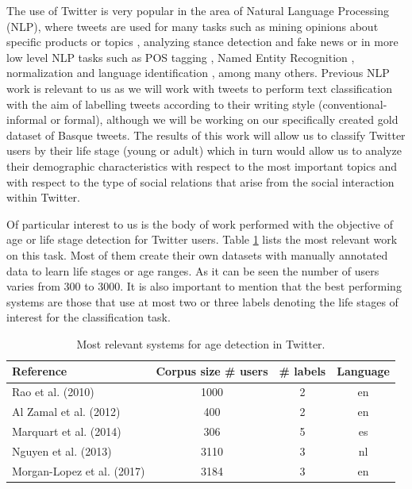 \documentclass[information,article,submit,moreauthors,pdftex,10pt,a4paper]{Definitions/mdpi}
\begin{document}
The use of Twitter is very popular in the area of Natural Language Processing (NLP), where tweets are used for many tasks such as mining opinions about specific products or topics \cite{rosenthal2017semeval,villena2013tass}, analyzing stance detection and fake news \cite{S16-1003,zubiaga2017stance} or in more low level NLP tasks such as POS tagging \cite{ritter_named_2011}, Named Entity Recognition \cite{baldwin2015shared}, normalization \cite{alegria2015tweetnorm} and language identification \cite{zubiaga2016tweetlid}, among many others. Previous NLP work is relevant to us as we will work with tweets to perform text classification with the aim of labelling tweets according to their writing style (conventional-informal or formal), although we will be working on our specifically created gold dataset of Basque tweets. The results of this work will allow us to classify Twitter users by their life stage (young or adult) which in turn would allow us to analyze their demographic characteristics with respect to the most important topics and with respect to the type of social relations that arise from the social interaction within Twitter.

Of particular interest to us is the body of work performed with the objective of age or life stage detection for Twitter users. Table \ref{tab:arte ezaug} lists the most relevant work on this task. Most of them create their own datasets with manually annotated data to learn life stages or age ranges. As it can be seen the number of users varies from 300 to 3000. It is also important to mention that the best performing systems are those that use at most two  \cite{rao2010classifying,al2012homophily} or three \cite{nguyen2013old,morgan2017predicting} labels denoting the life stages of interest for the classification task.

\begin{table}[H]
  \centering
  \begin{tabular}{lccc}\hline
    Reference & Corpus size \# users & \# labels & Language \\ \hline \hline
    Rao et al. (2010) & 1000 & 2 & en \\
    Al Zamal et al. (2012) & 400 & 2 & en \\
    Marquart et al. (2014) & 306 & 5 & es \\
    Nguyen et al. (2013) & 3110 & 3 & nl \\
    Morgan-Lopez et al. (2017) & 3184 & 3 & en \\ \hline
  \end{tabular}
  \caption{Most relevant systems for age detection in Twitter.}
  \label{tab:arte ezaug}
\end{table}
\end{document}

